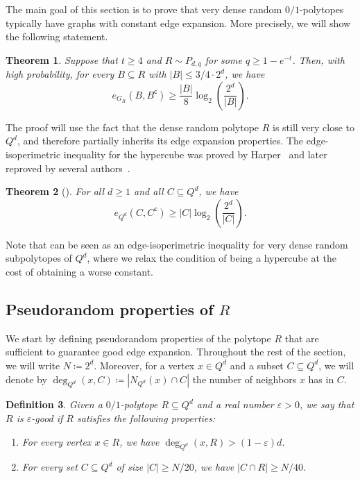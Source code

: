 \documentclass[11pt,a4paper,oneside,reqno]{amsart}
\newtheorem{theorem}{Theorem}[section]
\newtheorem{definition}[theorem]{Definition}
\newcommand{\eps}{\varepsilon}
\begin{document}
The main goal of this section is to prove that very dense random $0/1$-polytopes typically have graphs with constant edge expansion. More precisely, we will show the following statement.

\begin{theorem}\label{thm:verydense}
  Suppose that $t\geq4$ and $R \sim P_{d,q}$ for some $q \geq 1 - e^{-t}$. Then, with high probability, for every $B \subseteq R$ with $|B| \leq 3/4 \cdot 2^d$, we have
  \[
    e_{G_R}(B, B^{\mathsf{c}}) \geq \frac{|B|}{8} \log_2 \left(\frac{2^d}{|B|}\right).
  \]
\end{theorem}

The proof will use the fact that the dense random polytope $R$ is still very close to $Q^d$, and therefore partially inherits its edge expansion properties.
The edge-isoperimetric inequality for the hypercube was proved by Harper~\cite{Harper64} and later reproved by several authors~\cites{B67, Hart76, Lindsey64}.

\begin{theorem}[\cite{Harper64}]
  \label{thm:Harper}
  For all $d \ge 1$ and all $C \subseteq Q^d$, we have
  \[
    e_{Q^d}(C, C^{\mathsf{c}}) \geq |C| \log_2\left(\frac{2^d}{|C|}\right).
  \]
\end{theorem}

Note that  can be seen as an edge-isoperimetric inequality for very dense random subpolytopes of $Q^d$, where we relax the condition of being a hypercube at the cost of obtaining a worse constant.

\subsection{Pseudorandom properties of $R$}

We start by defining pseudorandom properties of the polytope $R$ that are sufficient to guarantee good edge expansion.  Throughout the rest of the section, we will write $N \coloneqq 2^d$.  Moreover, for a vertex $x\in Q^d$ and a subset $C\subseteq Q^d$, we will denote by $\deg_{Q^d}(x,C) \coloneqq |N_{Q^d}(x) \cap C|$ the number of neighbors $x$ has in $C$. 

\begin{definition}\label{def:Rproperty}
  Given a $0/1$-polytope $R\subseteq Q^d$ and a real number $\eps>0$, we say that $R$ is \emph{$\eps$-good} if $R$ satisfies the following properties:
  \begin{enumerate}[label=(R\arabic*)]
  \item
    \label{item:epsgood-neighborhood}
    For every vertex $x\in R$, we have $\deg_{Q^d}(x, R) > (1-\eps)d$.
  \item
    \label{item:epsgood-intersection}
    For every set $C\subseteq Q^d$ of size $|C|\geq N/20$, we have $|C\cap R|\geq N/40$.
  \end{enumerate}
\end{definition}
\end{document}
